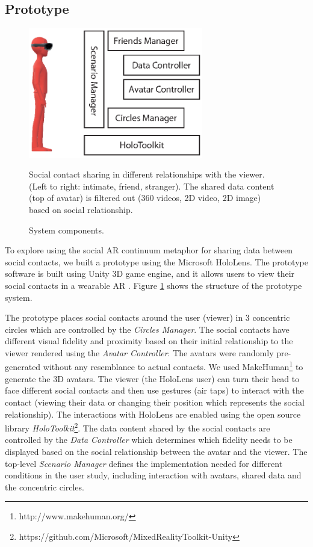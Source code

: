 \subsection{Prototype}

\begin{figure}[ht]
    \centering
    \includegraphics[width=3in]{images/chi/images-03.eps}
    \caption{Social contact sharing in different relationships with the viewer. (Left to right: intimate, friend, stranger). The shared data content (top of avatar) is filtered out (360 videos, 2D video, 2D image) based on social relationship.}
      \caption{System components.}
      \label{fig:data:system}
\end{figure}

To explore using the social AR continuum metaphor for sharing data between social contacts, we built a prototype using the Microsoft HoloLens. The prototype software is built using Unity 3D game engine, and it allows users to view their social contacts in a wearable AR . Figure \ref{fig:data:system} shows the structure of the prototype system. 

The prototype places social contacts around the user (viewer) in 3 concentric circles which are controlled by the \textit{Circles Manager}. The social contacts have different visual fidelity and proximity based on their initial relationship to the viewer rendered using the \textit{Avatar Controller}. The avatars were randomly pre-generated without any resemblance to actual contacts. We used MakeHuman\footnote{http://www.makehuman.org/} to generate the 3D avatars. The viewer (the HoloLens user) can turn their head to face different social contacts and then use gestures (air taps) to interact with the contact (viewing their data or changing their position which represents the social relationship). The interactions with HoloLens are enabled using the open source library \textit{HoloToolkit}\footnote{https://github.com/Microsoft/MixedRealityToolkit-Unity}. The data content shared by the social contacts are controlled by the \textit{Data Controller} which determines which fidelity needs to be displayed based on the social relationship between the avatar and the viewer. The top-level \textit{Scenario Manager} defines the implementation needed for different conditions in the user study, including interaction with avatars, shared data and the concentric circles. 

